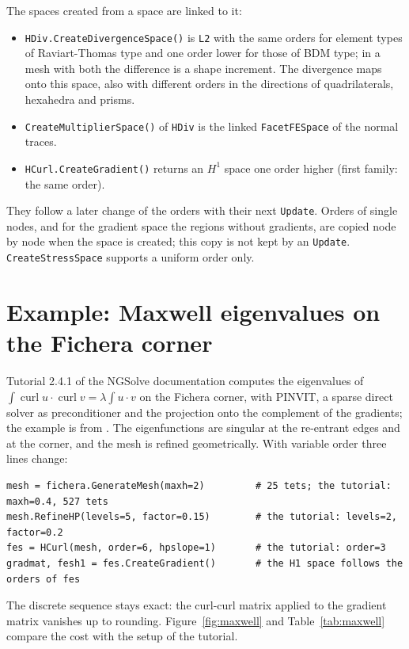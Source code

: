 \documentclass[10pt,a4paper]{article}
\newcommand{\code}[1]{\texttt{#1}}
\begin{document}
The spaces created from a space are linked to it:
\begin{itemize}\setlength\itemsep{1pt}
\item \code{HDiv.CreateDivergenceSpace()} is \code{L2} with the same orders for element types of Raviart-Thomas type and one order lower for those of BDM type; in a mesh with both the difference is a shape increment. The divergence maps onto this space, also with different orders in the directions of quadrilaterals, hexahedra and prisms.
\item \code{CreateMultiplierSpace()} of \code{HDiv} is the linked \code{FacetFESpace} of the normal traces.
\item \code{HCurl.CreateGradient()} returns an $H^1$ space one order higher (first family: the same order).
\end{itemize}
They follow a later change of the orders with their next \code{Update}. Orders of single nodes, and for the gradient space the regions without gradients, are copied node by node when the space is created; this copy is not kept by an \code{Update}. \code{CreateStressSpace} supports a uniform order only.

\section{Example: Maxwell eigenvalues on the Fichera corner}

Tutorial 2.4.1 of the NGSolve documentation computes the eigenvalues of $\int \operatorname{curl} u \cdot \operatorname{curl} v = \lambda \int u \cdot v$ on the Fichera corner, with PINVIT, a sparse direct solver as preconditioner and the projection onto the complement of the gradients; the example is from \cite{z06}. The eigenfunctions are singular at the re-entrant edges and at the corner, and the mesh is refined geometrically. With variable order three lines change:
\begin{lstlisting}
mesh = fichera.GenerateMesh(maxh=2)         # 25 tets; the tutorial: maxh=0.4, 527 tets
mesh.RefineHP(levels=5, factor=0.15)        # the tutorial: levels=2, factor=0.2
fes = HCurl(mesh, order=6, hpslope=1)       # the tutorial: order=3
gradmat, fesh1 = fes.CreateGradient()       # the H1 space follows the orders of fes
\end{lstlisting}
The discrete sequence stays exact: the curl-curl matrix applied to the gradient matrix vanishes up to rounding. Figure~\ref{fig:maxwell} and Table~\ref{tab:maxwell} compare the cost with the setup of the tutorial.
\end{document}
